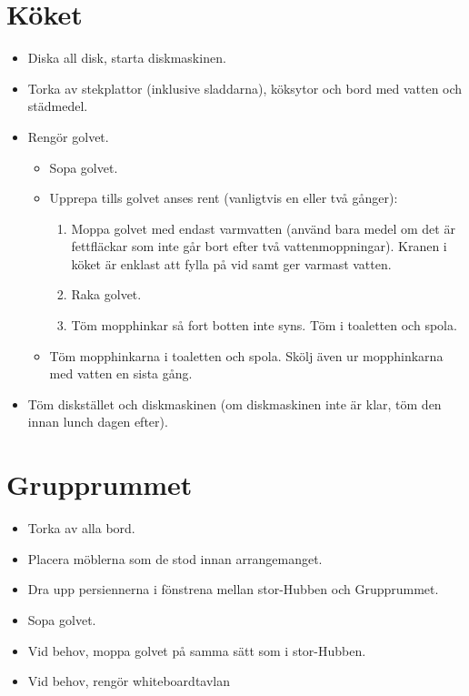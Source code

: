 \section{Köket}
\begin{itemize}
    \item Diska all disk, starta diskmaskinen.
    \item Torka av stekplattor (inklusive sladdarna), köksytor och bord med vatten och städmedel.
    \item Rengör golvet.
    \begin{itemize}
        \item Sopa golvet.
        \item Upprepa tills golvet anses rent (vanligtvis en eller två gånger):
        \begin{enumerate}
            \item Moppa golvet med endast varmvatten (använd bara medel om det är fettfläckar som inte går bort efter två vattenmoppningar). Kranen i köket är enklast att fylla på vid samt ger varmast vatten.
            \item Raka golvet.
            \item Töm mopphinkar så fort botten inte syns. Töm i toaletten och spola.
        \end{enumerate}
        \item Töm mopphinkarna i toaletten och spola. Skölj även ur mopphinkarna med vatten en sista gång.
    \end{itemize}
    \item Töm diskstället och diskmaskinen (om diskmaskinen inte är klar, töm den innan lunch dagen efter).
\end{itemize}

\section{Grupprummet}
\begin{itemize}
    \item Torka av alla bord.
    \item Placera möblerna som de stod innan arrangemanget.
    \item Dra upp persiennerna i fönstrena mellan stor-Hubben och Grupprummet.
    \item Sopa golvet.
    \item Vid behov, moppa golvet på samma sätt som i stor-Hubben.
    \item Vid behov, rengör whiteboardtavlan
\end{itemize}

